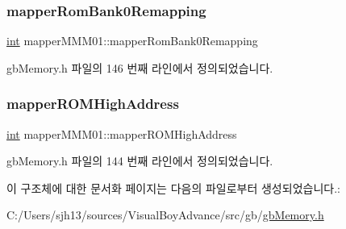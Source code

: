\subsubsection{\texorpdfstring{mapper\+Rom\+Bank0\+Remapping}{mapperRomBank0Remapping}}
{\footnotesize\ttfamily \mbox{\hyperlink{_util_8cpp_a0ef32aa8672df19503a49fab2d0c8071}{int}} mapper\+M\+M\+M01\+::mapper\+Rom\+Bank0\+Remapping}



gb\+Memory.\+h 파일의 146 번째 라인에서 정의되었습니다.

\mbox{\label{structmapper_m_m_m01_a934a4728ec31f549910192215c163947}} 
\subsubsection{\texorpdfstring{mapper\+R\+O\+M\+High\+Address}{mapperROMHighAddress}}
{\footnotesize\ttfamily \mbox{\hyperlink{_util_8cpp_a0ef32aa8672df19503a49fab2d0c8071}{int}} mapper\+M\+M\+M01\+::mapper\+R\+O\+M\+High\+Address}



gb\+Memory.\+h 파일의 144 번째 라인에서 정의되었습니다.



이 구조체에 대한 문서화 페이지는 다음의 파일로부터 생성되었습니다.\+:\begin{DoxyCompactItemize}
\item 
C\+:/\+Users/sjh13/sources/\+Visual\+Boy\+Advance/src/gb/\mbox{\hyperlink{gb_memory_8h}{gb\+Memory.\+h}}\end{DoxyCompactItemize}
